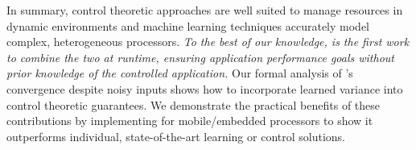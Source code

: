 In summary, control theoretic approaches are well suited to manage
resources in dynamic environments and machine learning techniques
accurately model complex, heterogeneous processors.  \emph{To the best
  of our knowledge, \SYSTEM{} is the first work to combine the two at
  runtime, ensuring application performance goals without prior
  knowledge of the controlled application.}  Our formal analysis of
\SYSTEM{}'s convergence despite noisy inputs shows how to incorporate
learned variance into control theoretic guarantees.  We demonstrate
the practical benefits of these contributions by implementing
\SYSTEM{} for mobile/embedded processors to show it outperforms
individual, state-of-the-art learning or control solutions.



